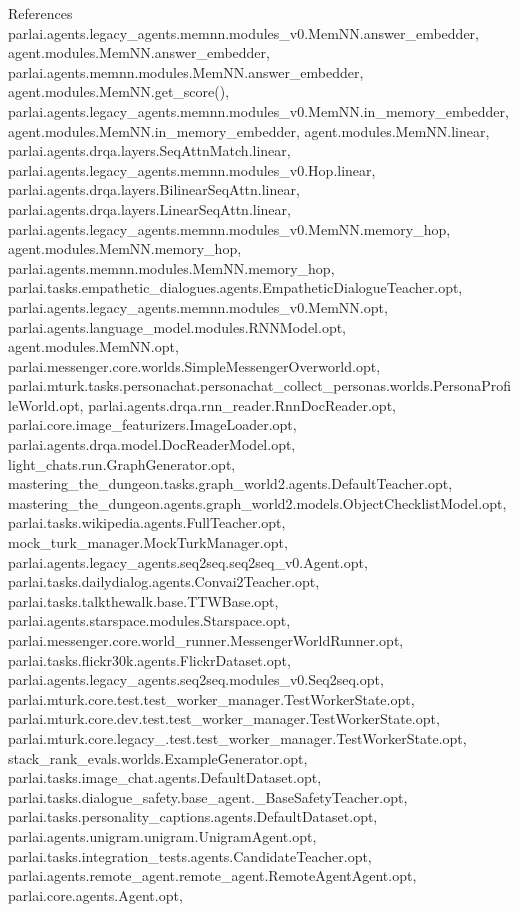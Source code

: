 References parlai.\+agents.\+legacy\+\_\+agents.\+memnn.\+modules\+\_\+v0.\+Mem\+N\+N.\+answer\+\_\+embedder, agent.\+modules.\+Mem\+N\+N.\+answer\+\_\+embedder, parlai.\+agents.\+memnn.\+modules.\+Mem\+N\+N.\+answer\+\_\+embedder, agent.\+modules.\+Mem\+N\+N.\+get\+\_\+score(), parlai.\+agents.\+legacy\+\_\+agents.\+memnn.\+modules\+\_\+v0.\+Mem\+N\+N.\+in\+\_\+memory\+\_\+embedder, agent.\+modules.\+Mem\+N\+N.\+in\+\_\+memory\+\_\+embedder, agent.\+modules.\+Mem\+N\+N.\+linear, parlai.\+agents.\+drqa.\+layers.\+Seq\+Attn\+Match.\+linear, parlai.\+agents.\+legacy\+\_\+agents.\+memnn.\+modules\+\_\+v0.\+Hop.\+linear, parlai.\+agents.\+drqa.\+layers.\+Bilinear\+Seq\+Attn.\+linear, parlai.\+agents.\+drqa.\+layers.\+Linear\+Seq\+Attn.\+linear, parlai.\+agents.\+legacy\+\_\+agents.\+memnn.\+modules\+\_\+v0.\+Mem\+N\+N.\+memory\+\_\+hop, agent.\+modules.\+Mem\+N\+N.\+memory\+\_\+hop, parlai.\+agents.\+memnn.\+modules.\+Mem\+N\+N.\+memory\+\_\+hop, parlai.\+tasks.\+empathetic\+\_\+dialogues.\+agents.\+Empathetic\+Dialogue\+Teacher.\+opt, parlai.\+agents.\+legacy\+\_\+agents.\+memnn.\+modules\+\_\+v0.\+Mem\+N\+N.\+opt, parlai.\+agents.\+language\+\_\+model.\+modules.\+R\+N\+N\+Model.\+opt, agent.\+modules.\+Mem\+N\+N.\+opt, parlai.\+messenger.\+core.\+worlds.\+Simple\+Messenger\+Overworld.\+opt, parlai.\+mturk.\+tasks.\+personachat.\+personachat\+\_\+collect\+\_\+personas.\+worlds.\+Persona\+Profile\+World.\+opt, parlai.\+agents.\+drqa.\+rnn\+\_\+reader.\+Rnn\+Doc\+Reader.\+opt, parlai.\+core.\+image\+\_\+featurizers.\+Image\+Loader.\+opt, parlai.\+agents.\+drqa.\+model.\+Doc\+Reader\+Model.\+opt, light\+\_\+chats.\+run.\+Graph\+Generator.\+opt, mastering\+\_\+the\+\_\+dungeon.\+tasks.\+graph\+\_\+world2.\+agents.\+Default\+Teacher.\+opt, mastering\+\_\+the\+\_\+dungeon.\+agents.\+graph\+\_\+world2.\+models.\+Object\+Checklist\+Model.\+opt, parlai.\+tasks.\+wikipedia.\+agents.\+Full\+Teacher.\+opt, mock\+\_\+turk\+\_\+manager.\+Mock\+Turk\+Manager.\+opt, parlai.\+agents.\+legacy\+\_\+agents.\+seq2seq.\+seq2seq\+\_\+v0.\+Agent.\+opt, parlai.\+tasks.\+dailydialog.\+agents.\+Convai2\+Teacher.\+opt, parlai.\+tasks.\+talkthewalk.\+base.\+T\+T\+W\+Base.\+opt, parlai.\+agents.\+starspace.\+modules.\+Starspace.\+opt, parlai.\+messenger.\+core.\+world\+\_\+runner.\+Messenger\+World\+Runner.\+opt, parlai.\+tasks.\+flickr30k.\+agents.\+Flickr\+Dataset.\+opt, parlai.\+agents.\+legacy\+\_\+agents.\+seq2seq.\+modules\+\_\+v0.\+Seq2seq.\+opt, parlai.\+mturk.\+core.\+test.\+test\+\_\+worker\+\_\+manager.\+Test\+Worker\+State.\+opt, parlai.\+mturk.\+core.\+dev.\+test.\+test\+\_\+worker\+\_\+manager.\+Test\+Worker\+State.\+opt, parlai.\+mturk.\+core.\+legacy\+\_.\+test.\+test\+\_\+worker\+\_\+manager.\+Test\+Worker\+State.\+opt, stack\+\_\+rank\+\_\+evals.\+worlds.\+Example\+Generator.\+opt, parlai.\+tasks.\+image\+\_\+chat.\+agents.\+Default\+Dataset.\+opt, parlai.\+tasks.\+dialogue\+\_\+safety.\+base\+\_\+agent.\+\_\+\+Base\+Safety\+Teacher.\+opt, parlai.\+tasks.\+personality\+\_\+captions.\+agents.\+Default\+Dataset.\+opt, parlai.\+agents.\+unigram.\+unigram.\+Unigram\+Agent.\+opt, parlai.\+tasks.\+integration\+\_\+tests.\+agents.\+Candidate\+Teacher.\+opt, parlai.\+agents.\+remote\+\_\+agent.\+remote\+\_\+agent.\+Remote\+Agent\+Agent.\+opt, parlai.\+core.\+agents.\+Agent.\+opt, 